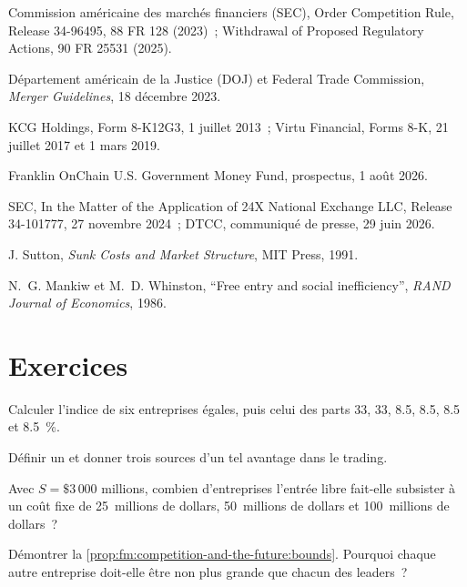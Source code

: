 \begin{omsources}
\item Commission américaine des marchés financiers (SEC), Order Competition Rule, Release 34-96495, 88 FR 128 (2023)~; Withdrawal of Proposed Regulatory Actions,
90 FR 25531 (2025).
\item Département américain de la Justice (DOJ) et Federal Trade Commission, \emph{Merger Guidelines}, 18 décembre 2023.
\item KCG Holdings, Form 8-K12G3, 1 juillet 2013~; Virtu Financial, Forms 8-K, 21 juillet 2017 et 1 mars 2019.
\item Franklin OnChain U.S. Government Money Fund, prospectus, 1 août 2026.
\item SEC, In the Matter of the Application of 24X National Exchange LLC, Release 34-101777, 27 novembre 2024~; DTCC, communiqué de presse, 29 juin 2026.
\item J. Sutton, \emph{Sunk Costs and Market Structure}, MIT Press, 1991.
\item N.~G. Mankiw et M.~D. Whinston, ``Free entry and social inefficiency'', \emph{RAND Journal of Economics}, 1986.
\end{omsources}

\section{Exercices}

\begin{exercise}[$\star$]\label{exo:fm:competition-and-the-future:1}
Calculer l'indice de six entreprises égales, puis celui des parts 33, 33, 8.5, 8.5, 8.5 et 8.5~\%.
\end{exercise}

\begin{exercise}[$\star$]\label{exo:fm:competition-and-the-future:2}
Définir un  et donner trois sources d'un tel avantage dans le trading.
\end{exercise}

\begin{exercise}[$\star$]\label{exo:fm:competition-and-the-future:3}
Avec $S=\$3\,000$ millions, combien d'entreprises l'entrée libre fait-elle subsister à un coût fixe de 25~millions de dollars, 50~millions de dollars et 100~millions de dollars~?
\end{exercise}

\begin{exercise}[$\star\star$]\label{exo:fm:competition-and-the-future:4}
Démontrer la \cref{prop:fm:competition-and-the-future:bounds}. Pourquoi chaque autre entreprise doit-elle être non plus grande que chacun des leaders~?
\end{exercise}

